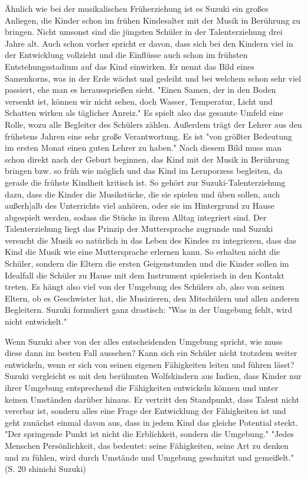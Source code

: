 Ähnlich wie bei der musikalischen Früherziehung ist es Suzuki ein großes
Anliegen, die Kinder schon im frühen Kindesalter mit der Musik in Berührung zu
bringen. Nicht umsonst sind die jüngsten Schüler in der Talenterziehung drei
Jahre alt. Auch schon vorher spricht er davon, dass sich bei den Kindern viel in
der Entwicklung vollzieht und die Einflüsse auch schon im frühsten
Entstehungsstadium auf das Kind einwirken. Er nennt das Bild eines Samenkorns,
was in der Erde wächst und gedeiht und bei welchem schon sehr viel passiert, ehe
man es heraussprießen sieht. "Einen Samen, der in den Boden versenkt ist, können
wir nicht sehen, doch Wasser, Temperatur, Licht und Schatten wirken als
täglicher Anreiz."\autocite[17]{suzuki:erziehung_ist_liebe} Es spielt also das
gesamte Umfeld eine Rolle, wozu alle Begleiter des Schülers zählen. Außerdem
trägt der Lehrer aus den frühstens Jahren eine sehr große Verantwortung. Es ist
"von größter Bedeutung im ersten Monat einen guten Lehrer zu haben."
\autocite[21]{suzuki:erziehung_ist_liebe} Nach diesem Bild muss man schon direkt
nach der Geburt beginnen, das Kind mit der Musik in Berührung bringen bzw. so
früh wie möglich und das Kind im Lernporzess begleiten, da gerade die frühste
Kindheit kritisch ist. \autocite[25]{suzuki:erziehung_ist_liebe} So gehört zur
Suzuki-Talenterziehung dazu, dass die Kinder die Musikstücke, die sie spielen
und üben sollen, auch außerh]alb des Unterrichts viel anhören, oder sie im
Hintergrund zu Hause abgespielt werden, sodass die Stücke in ihrem Alltag
integriert sind. Der Talenterziehung liegt das Prinzip der Muttersprache
zugrunde und Suzuki versucht die Musik so natürlich in das Leben des Kindes zu
integrieren, dass das Kind die Musik wie eine Muttersprache erlernen kann.  So
erhalten nicht die Schüler, sondern die Eltern die ersten Geigenstunden und die
Kinder sollen im Idealfall die Schüler zu Hause mit dem Instrument spielerisch
in den Kontakt treten. \autocite[75]{suzuki:erziehung_ist_liebe} Es hängt also
viel von der Umgebung des Schülers ab, also von seinen Eltern, ob es Geschwister
hat, die Musizieren, den Mitschülern und allen anderen Begleitern. Suzuki
formuliert ganz drastisch: "Was in der Umgebung fehlt, wird nicht entwickelt."
\autocite[25]{suzuki:erziehung_ist_liebe}

Wenn Suzuki aber von der alles entscheidenden Umgebung spricht, wie muss diese
dann im besten Fall aussehen? Kann sich ein Schüler nicht trotzdem weiter
entwickeln, wenn er sich von seinen eigenen Fähigkeiten leiten und führen lässt?
Suzuki vergleicht es mit den berühmten Wolfskindern aus Indien, dass Kinder nur
ihrer Umgebung entsprechend die Fähigkeiten entwickeln können und unter keinen
Umständen darüber hinaus. \autocite[24]{suzuki:erziehung_ist_liebe} Er vertritt
den Standpunkt, dass Talent nicht vererbar ist, sondern alles eine Frage der
Entwicklung der Fähigkeiten ist und geht zunächst einmal davon aus, dass in
jedem Kind das gleiche Potential steckt. "Der springende Punkt ist nicht die
Erblichkeit, sondern die Umgebung." \autocite[24]{suzuki:erziehung_ist_liebe}
"Jedes Menschen Persönlichkeit, das bedeutet: seine Fähigkeiten, seine Art zu
denken und zu fühlen, wird durch Umstände und Umgebung geschnitzt und
gemeißelt." (S. 20 shinichi Suzuki)


